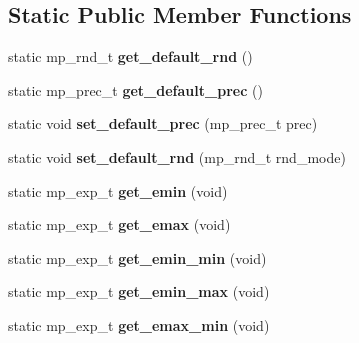 \subsection*{Static Public Member Functions}
\begin{DoxyCompactItemize}
\item 
\mbox{\label{classmpfr_1_1mpreal_ae0bdf9ca1838bd5851ac1c7c6b360553}} 
static mp\+\_\+rnd\+\_\+t {\bfseries get\+\_\+default\+\_\+rnd} ()
\item 
\mbox{\label{classmpfr_1_1mpreal_aae18e3b781bffbf4fd9938d4d3043aa1}} 
static mp\+\_\+prec\+\_\+t {\bfseries get\+\_\+default\+\_\+prec} ()
\item 
\mbox{\label{classmpfr_1_1mpreal_a9b73e807e478274ffb15289730a0c8cb}} 
static void {\bfseries set\+\_\+default\+\_\+prec} (mp\+\_\+prec\+\_\+t prec)
\item 
\mbox{\label{classmpfr_1_1mpreal_a2f1cca163386a7eac4b6b8fd42e1a59e}} 
static void {\bfseries set\+\_\+default\+\_\+rnd} (mp\+\_\+rnd\+\_\+t rnd\+\_\+mode)
\item 
\mbox{\label{classmpfr_1_1mpreal_a36e85ed79db09759c34ed7fd3633f6f8}} 
static mp\+\_\+exp\+\_\+t {\bfseries get\+\_\+emin} (void)
\item 
\mbox{\label{classmpfr_1_1mpreal_a657bbecc169f605afbacf5656a2842fd}} 
static mp\+\_\+exp\+\_\+t {\bfseries get\+\_\+emax} (void)
\item 
\mbox{\label{classmpfr_1_1mpreal_aabf7b148f6c8086b7865aa8306258b32}} 
static mp\+\_\+exp\+\_\+t {\bfseries get\+\_\+emin\+\_\+min} (void)
\item 
\mbox{\label{classmpfr_1_1mpreal_ae011332a08888a0be59d57f2e72ec4c4}} 
static mp\+\_\+exp\+\_\+t {\bfseries get\+\_\+emin\+\_\+max} (void)
\item 
\mbox{\label{classmpfr_1_1mpreal_a05156da386da2186d1c6c8ae977f1989}} 
static mp\+\_\+exp\+\_\+t {\bfseries get\+\_\+emax\+\_\+min} (void)
\item 
\mbox{\label{classmpfr_1_1mpreal_a66094b022a262fcd9def5413508eeb92}} 

\end{DoxyCompactItemize}
